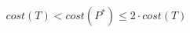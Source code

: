 \documentclass[preview]{standalone}
\begin{document}
\begin{align*}
cost(T) < cost(P^*) \leq 2 \cdot cost(T)
\end{align*}
\end{document}
